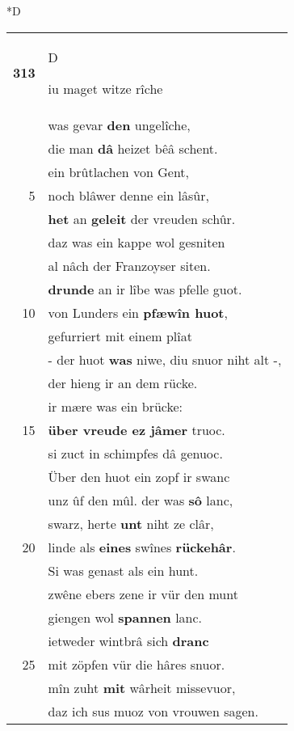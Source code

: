\documentclass[8pt,a4paper,notitlepage]{article}
\begin{document}
\begin{table}[ht]
\begin{minipage}[t]{0.5\linewidth}
\small
\begin{center}*D
\end{center}
\begin{tabular}{rl}
\textbf{313} & \begin{large}D\end{large}iu maget witze rîche\\ 
 & was gevar \textbf{den} ungelîche,\\ 
 & die man \textbf{dâ} heizet bêâ schent.\\ 
 & ein brûtlachen von Gent,\\ 
5 & noch blâwer denne ein lâsûr,\\ 
 & \textbf{het} an \textbf{geleit} der vreuden schûr.\\ 
 & daz was ein kappe wol gesniten\\ 
 & al nâch der Franzoyser siten.\\ 
 & \textbf{drunde} an ir lîbe was pfelle guot.\\ 
10 & von Lunders ein \textbf{pfæwîn huot},\\ 
 & gefurriert mit einem plîat\\ 
 & - der huot \textbf{was} niwe, diu snuor niht alt -,\\ 
 & der hieng ir an dem rücke.\\ 
 & ir mære was ein brücke:\\ 
15 & \textbf{über vreude ez jâmer} truoc.\\ 
 & si zuct in schimpfes dâ genuoc.\\ 
 & Über den huot ein zopf ir swanc\\ 
 & unz ûf den mûl. der was \textbf{sô} lanc,\\ 
 & swarz, herte \textbf{unt} niht ze clâr,\\ 
20 & linde als \textbf{eines} swînes \textbf{rückehâr}.\\ 
 & Si was genast als ein hunt.\\ 
 & zwêne ebers zene ir vür den munt\\ 
 & giengen wol \textbf{spannen} lanc.\\ 
 & ietweder wintbrâ sich \textbf{dranc}\\ 
25 & mit zöpfen vür die hâres snuor.\\ 
 & mîn zuht \textbf{mit} wârheit missevuor,\\ 
 & daz ich sus muoz von vrouwen sagen.\\ 

\end{tabular}
\end{minipage}
\end{table}
\end{document}
